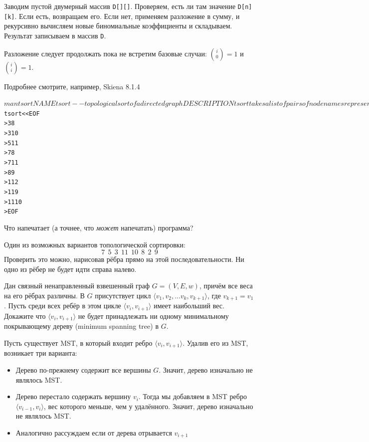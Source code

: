 \documentclass[12pt,answers]{exam}
\begin{document}
\begin{questions}
\begin{solution}
Заводим пустой двумерный массив {\tt D[][]}. Проверяем, есть ли там значение {\tt D[n][k]}. Если есть, возвращаем его. Если нет, применяем разложение в сумму, и рекурсивно вычисляем новые биномиальные коэффициенты и складываем. Результат записываем в массив {\tt D}.

Разложение следует продолжать пока не встретим базовые случаи: $\binom{i}{0} = 1$ и $\binom{i}{i} = 1$.

Подробнее смотрите, например, Skiena 8.1.4
\end{solution}


\question[3]
\begin{alltt}
$ man tsort 

NAME
     tsort -- topological sort of a directed graph

DESCRIPTION
     tsort takes a list of pairs of node names representing directed arcs
     in a graph and prints the nodes in topological order on standard output.

<...>

$ tsort <<EOF
> 3 8
> 3 10
> 5 11
> 7 8
> 7 11
> 8 9
> 11 2
> 11 9
> 11 10
> EOF
\end{alltt}

Что напечатает (а точнее, что {\em может} напечатать) программа?

  \begin{solution}
    Один из возможных вариантов топологической сортировки:
    $$
    7~~5~~3~~11~~10~~8~~2~~9
    $$
    Проверить это можно, нарисовав рёбра прямо на этой последовательности. Ни одно из рёбер не будет идти справа налево.
  \end{solution}

\newpage

\question[5]
Дан связный ненаправленный взвешенный граф $G=(V,E,w)$, причём все веса на его рёбрах различны. В $G$ присутствует цикл $\langle v_1, v_2, ... v_k, v_{k+1} \rangle$, где $v_{k+1} = v_1$. Пусть среди всех ребёр в этом цикле $\langle v_i, v_{i+1} \rangle$ имеет наибольший вес. Докажите что $\langle v_i, v_{i+1} \rangle$ не будет принадлежать ни одному минимальному покрывающему дереву (minimum spanning tree) в $G$.

  \begin{solution}
    Пусть существует MST, в который входит ребро $\langle v_i, v_{i+1} \rangle$. Удалив его из MST, возникает три варианта:
    \begin{itemize}
      \item Дерево по-прежнему содержит все вершины $G$. Значит, дерево изначально не являлось MST.
      \item Дерево перестало содержать вершину $v_i$. Тогда мы добавляем в MST ребро $\langle v_{i-1}, v_{i} \rangle$, вес которого меньше, чем у удалённого. Значит, дерево изначально не являлось MST.
      \item Аналогично рассуждаем если от дерева отрывается $v_{i+1}$
    \end{itemize}


\end{solution}
\end{questions}
\end{document}
